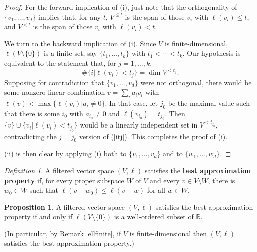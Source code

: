 \documentclass[11pt]{amsart}
\theoremstyle{definition}
\newtheorem{prop}[theorem]{Proposition}
\theoremstyle{remark}
\newtheorem{dfn}[theorem]{Definition}
\numberwithin{equation}{section}
\begin{document}
\begin{proof}
	For the forward implication of (i), just note that the orthogonality of $\{v_1,\ldots,v_d\}$ implies that, for any $t$, $V^{\leq t}$ is the span of those $v_i$ with $\ell(v_i)\leq t$, and $V^{<t}$ is the span of those $v_i$ with $\ell(v_i)<t$.  
	
	We turn to the backward implication of (i).  Since $V$ is finite-dimensional, $\ell(V\setminus\{0\})$ is a finite set, say $\{t_1,\ldots,t_k\}$ with $t_1<\cdots<t_k$.  Our hypothesis is equivalent to the statement that, for $j=1,\ldots,k$, \begin{equation}\label{itj}\#\{i|\ell(v_i)<t_j\}=\dim V^{<t_j}.\end{equation}  Supposing for contradiction that $\{v_1,\ldots,v_d\}$ were not orthogonal, there would be some nonzero linear combination $v=\sum_i a_iv_i$ with $\ell(v)<\max\{\ell(v_i)|a_i\neq 0\}$.  In that case, let $j_0$ be the maximal value such that there is some $i_0$ with $a_{i_0}\neq 0$ and $\ell(v_{i_0})=t_{j_0}$.  Then $\{v\}\cup \{v_i|\ell(v_i)<t_{j_0}\}$ would be a linearly independent set in $V^{<t_{j_0}}$, contradicting the $j=j_0$ version of (\ref{itj}).  This completes the proof of (i).
	
	(ii) is then clear by applying (i) both to $\{v_1,\ldots,v_d\}$ and to $\{w_1,\ldots,w_d\}$.     
\end{proof}

\begin{dfn}
	A filtered vector space $(V,\ell)$ satisfies the \textbf{best approximation property} if, for every proper subspace $W$ of $V$ and every $v\in V\setminus W$, there is $w_0\in W$ such that $\ell(v-w_0)\leq \ell(v-w)$ for all $w\in W$.
\end{dfn}

\begin{prop} \label{wellbest}
	A filtered vector space $(V,\ell)$ satisfies the best approximation property if and only if $\ell(V\setminus \{0\})$ is a well-ordered subset of $\mathbb{R}$.
\end{prop}

(In particular, by Remark \ref{ellfinite}, if $V$ is finite-dimensional then $(V,\ell)$ satisfies the best approximation property.)
\end{document}
